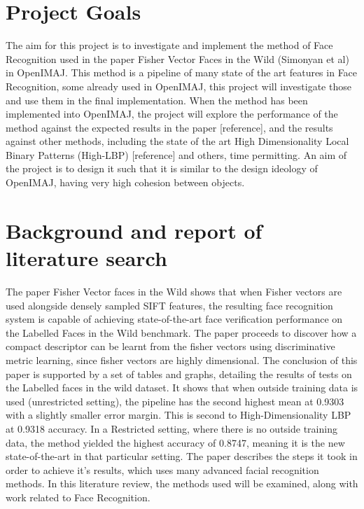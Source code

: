 \documentclass[12pt, a4paper]{article}
\begin{document}
       
        \tableofcontents
       
 
 
        \newpage
 \section*{Project Goals}
The aim for this project is to investigate and implement the method of Face Recognition used in the paper Fisher Vector Faces in the Wild (Simonyan et al) in OpenIMAJ. This method is a pipeline of many state of the art features in Face Recognition, some already used in OpenIMAJ, this project will investigate those and use them in the final implementation. When the method has been implemented into OpenIMAJ, the project will explore the performance of the method against the expected results in the paper [reference], and the results against other methods, including the state of the art High Dimensionality Local Binary Patterns (High-LBP) [reference] and others, time permitting. An aim of the project is to design it such that it is similar to the design ideology of OpenIMAJ, having very high cohesion between objects.

\newpage
\section{Background and report of literature search}
The paper Fisher Vector faces in the Wild \cite{simonyan2004fisher} shows that when Fisher vectors are used alongside densely sampled SIFT features, the resulting face recognition system is capable of achieving state-of-the-art face verification performance on the Labelled Faces in the Wild \cite{labelledFaces} benchmark. The paper proceeds to discover how a compact descriptor can be learnt from the fisher vectors using discriminative metric learning, since fisher vectors are highly dimensional. The conclusion of this paper is supported by a set of tables and graphs, detailing the results of tests on the Labelled faces in the wild dataset. It shows that when outside training data is used (unrestricted setting), the pipeline has the second highest mean at 0.9303 with a slightly smaller error margin. This is second to High-Dimensionality LBP at 0.9318 accuracy. In a Restricted setting, where there is no outside training data, the method yielded the highest accuracy of 0.8747, meaning it is the new state-of-the-art in that particular setting. The paper describes the steps it took in order to achieve it’s results, which uses many advanced facial recognition methods. In this literature review, the methods used will be examined, along with work related to Face Recognition.
\end{document}
